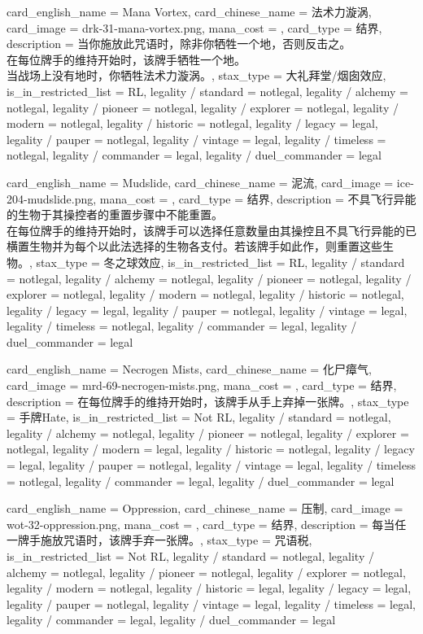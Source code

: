\documentclass[lang = cn, color = black, 10pt]{AllThatStax}
\begin{document}
\card
{
	card_english_name = {Mana Vortex},
	card_chinese_name = {法术力漩涡},
	card_image = drk-31-mana-vortex.png,
	mana_cost = ,
	card_type = 结界,
	description = {当你施放此咒语时，除非你牺牲一个地，否则反击之。\\
在每位牌手的维持开始时，该牌手牺牲一个地。\\
当战场上没有地时，你牺牲法术力漩涡。},
	stax_type = 大礼拜堂/烟囱效应,
	is_in_restricted_list = RL,
	legality / standard = notlegal,
	legality / alchemy = notlegal,
	legality / pioneer = notlegal,
	legality / explorer = notlegal,
	legality / modern = notlegal,
	legality / historic = notlegal,
	legality / legacy = legal,
	legality / pauper = notlegal,
	legality / vintage = legal,
	legality / timeless = notlegal,
	legality / commander = legal,
	legality / duel_commander = legal
}

\card
{
	card_english_name = {Mudslide},
	card_chinese_name = {泥流},
	card_image = ice-204-mudslide.png,
	mana_cost = ,
	card_type = 结界,
	description = {不具飞行异能的生物于其操控者的重置步骤中不能重置。\\
在每位牌手的维持开始时，该牌手可以选择任意数量由其操控且不具飞行异能的已横置生物并为每个以此法选择的生物各支付。若该牌手如此作，则重置这些生物。},
	stax_type = 冬之球效应,
	is_in_restricted_list = RL,
	legality / standard = notlegal,
	legality / alchemy = notlegal,
	legality / pioneer = notlegal,
	legality / explorer = notlegal,
	legality / modern = notlegal,
	legality / historic = notlegal,
	legality / legacy = legal,
	legality / pauper = notlegal,
	legality / vintage = legal,
	legality / timeless = notlegal,
	legality / commander = legal,
	legality / duel_commander = legal
}

\card
{
	card_english_name = {Necrogen Mists},
	card_chinese_name = {化尸瘴气},
	card_image = mrd-69-necrogen-mists.png,
	mana_cost = ,
	card_type = 结界,
	description = {在每位牌手的维持开始时，该牌手从手上弃掉一张牌。},
	stax_type = 手牌Hate,
	is_in_restricted_list = Not RL,
	legality / standard = notlegal,
	legality / alchemy = notlegal,
	legality / pioneer = notlegal,
	legality / explorer = notlegal,
	legality / modern = legal,
	legality / historic = notlegal,
	legality / legacy = legal,
	legality / pauper = notlegal,
	legality / vintage = legal,
	legality / timeless = notlegal,
	legality / commander = legal,
	legality / duel_commander = legal
}

\card
{
	card_english_name = {Oppression},
	card_chinese_name = {压制},
	card_image = wot-32-oppression.png,
	mana_cost = ,
	card_type = 结界,
	description = {每当任一牌手施放咒语时，该牌手弃一张牌。},
	stax_type = 咒语税,
	is_in_restricted_list = Not RL,
	legality / standard = notlegal,
	legality / alchemy = notlegal,
	legality / pioneer = notlegal,
	legality / explorer = notlegal,
	legality / modern = notlegal,
	legality / historic = legal,
	legality / legacy = legal,
	legality / pauper = notlegal,
	legality / vintage = legal,
	legality / timeless = legal,
	legality / commander = legal,
	legality / duel_commander = legal
}
\end{document}
